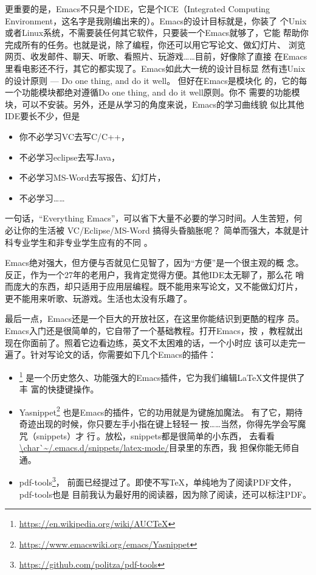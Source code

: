 更重要的是，Emacs不只是个IDE，它是个ICE（Integrated Computing
Environment，这名字是我刚编出来的）。Emacs的设计目标就是，你装了
个Unix或者Linux系统，不需要装任何其它软件，只要装一个Emacs就够了，它能
帮助你完成所有的任务。也就是说，除了编程，你还可以用它写论文、做幻灯片、
浏览网页、收发邮件、聊天、听歌、看照片、玩游戏……目前，好像除了直接
在Emacs里看电影还不行，其它的都实现了。Emacs如此大一统的设计目标显
然有违Unix的设计原则 --- Do one thing, and do it well。 但好在Emacs是模块化
的，它的每一个功能模块都绝对遵循Do one thing, and do it well原则。你不
需要的功能模块，可以不安装。另外，还是从学习的角度来说，Emacs的学习曲线貌
似比其他IDE要长不少，但是
\begin{itemize}
\item 你不必学习VC去写C/C++，
\item 不必学习eclipse去写Java，
\item 不必学习MS-Word去写报告、幻灯片，
\item 不必学习……
\end{itemize}
一句话，“Everything Emacs”，可以省下大量不必要的学习时间。人生苦短，何
必让你的生活被 VC/Eclipse/MS-Word 搞得头昏脑胀呢？ 简单而强大，本就是计
科专业学生和非专业学生应有的不同 。

Emacs绝对强大，但方便与否就见仁见智了，因为“方便”是一个很主观的概
念。反正，作为一个27年的老用户，我肯定觉得方便。其他IDE太无聊了，那么花
哨而庞大的东西，却只适用于应用层编程。既不能用来写论文，又不能做幻灯片，
更不能用来听歌、玩游戏。生活也太没有乐趣了。

最后一点，Emacs还是一个巨大的开放社区，在这里你能结识到更酷的程序
员。Emacs入门还是很简单的，它自带了一个基础教程。打开Emacs，按
，教程就出现在你面前了。照着它边看边练，英文不太困难的话，一个小时应
该可以走完一遍了。针对写论文的话，你需要如下几个Emacs的插件：

\begin{itemize}
\item \auctex\footnote{\url{https://en.wikipedia.org/wiki/AUCTeX}}%
  是一个历史悠久、功能强大的Emacs插件，它为我们编辑\LaTeX{}文件提供了丰
  富的快捷键操作\cite{auctex}。
\item
  Yasnippet\footnote{\url{https://www.emacswiki.org/emacs/Yasnippet}}%
  也是Emacs的插件，它的功用就是为{\LKeyTab}键施加魔法\cite{yasnippet}。
  有了它，期待奇迹出现的时候，你只要左手小指在{\LKeyTab}键上轻轻一
  按……当然，你得先学会写魔咒（snippets）才
  行\,\Frowny{}。\label{p:yasnippet}放松，snippets都是很简单的小东西，
  去看看\url{\char`~/.emacs.d/snippets/latex-mode/}目录里的东西，我
  担保你能无师自通。
\item pdf-tools\footnote{\url{https://github.com/politza/pdf-tools}}，
  前面已经提过了。即使不写\TeX{}，单纯地为了阅读PDF文件，pdf-tools也是
  目前我认为最好用的阅读器，因为除了阅读，还可以标注PDF。
\end{itemize}

